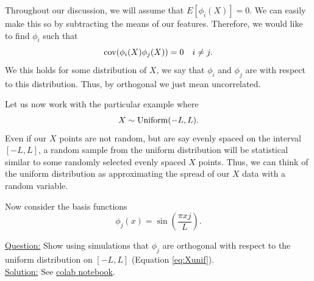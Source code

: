Throughout our discussion, we will assume that $E[\phi_i(X)]=0$. We can easily make this so by subtracting the means of our features. Therefore, we would like to find $\phi_i$ such that 
\begin{equation}\label{eq:orth}
{\rm cov}(\phi_i(X)\phi_j(X)) = 0 \quad i\ne j.
\end{equation}
We this holds for some distribution of $X$, we say that $\phi_i$ and $\phi_j$ are  with respect to this distribution. Thus, by orthogonal we just mean uncorrelated. 



\begin{example}\label{ex:sin}

Let us now work with the particular example where 
\begin{equation}\label{eq:Xunif}
X \sim {\rm Uniform}(-L,L).
\end{equation}
Even if our $X$ points are not random, but are say evenly spaced on the interval $[-L,L]$, a random sample from the uniform distribution will be statistical similar to some randomly selected evenly spaced $X$ points. Thus, we can think of the uniform distribution as approximating the spread of our $X$ data with a random variable. 

Now consider the basis functions 
\begin{equation*}
\phi_j(x) = \sin\left(\frac{\pi x j}{L} \right).
\end{equation*}

 


\noindent
\underline{Question:} Show using simulations that $\phi_j$ are orthogonal with respect to the uniform distribution on $[-L,L]$ (Equation \ref{eq:Xunif}). \\


\noindent
\underline{Solution:}  See \href{https://colab.research.google.com/drive/1EYcMviowfsnsVe7vsUKlyzkNsddUiTau?usp=sharing}{colab notebook}.

\end{example}



